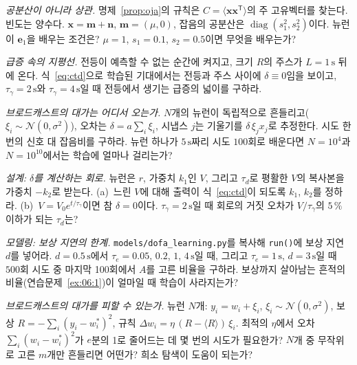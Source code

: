 \begin{exercise}[\lvlB]
\label{ex:06:3}
\emph{공분산이 아니라 상관.} 명제~\ref{prop:oja}의 규칙은 $C=\langle\mathbf x\mathbf x^{\mathsf T}\rangle$의 주 고유벡터를 찾는다. 빈도는 양수다. $\mathbf x=\mathbf m+\mathbf n$, $\mathbf m=(\mu,0)$, 잡음의 공분산은 $\operatorname{diag}(s_1^2,s_2^2)$이다. 뉴런이 $\mathbf e_1$을 배우는 조건은? $\mu=1$, $s_1=0.1$, $s_2=0.5$이면 무엇을 배우는가?
\end{exercise}

\begin{exercise}[\lvlA]
\label{ex:06:4}
\emph{급증 속의 지평선.} 전등이 예측할 수 없는 순간에 켜지고, 크기 $R$의 주스가 $L=1\,\text{s}$ 뒤에 온다. 식~\eqref{eq:ctd}으로 학습된 기대에서는 전등과 주스 사이에 $\delta\equiv0$임을 보이고, $\tau_\gamma=2\,\text{s}$와 $\tau_\gamma=4\,\text{s}$일 때 전등에서 생기는 급증의 넓이를 구하라.
\end{exercise}

\begin{exercise}[\lvlB]
\label{ex:06:5}
\emph{브로드캐스트의 대가는 어디서 오는가.} $N$개의 뉴런이 독립적으로 흔들리고($\xi_i\sim\mathcal N(0,\sigma^2)$), 오차는 $\delta=a\sum_i\xi_i$, 시냅스 $j$는 기울기를 $\delta\,\xi_jx_j$로 추정한다. 시도 한 번의 신호 대 잡음비를 구하라. 뉴런 하나가 $5\,\text{s}$짜리 시도 $100$회로 배운다면 $N=10^4$과 $N=10^{10}$에서는 학습에 얼마나 걸리는가?
\end{exercise}

\begin{exercise}[\lvlB]
\label{ex:06:6}
\emph{설계: $\delta$를 계산하는 회로.}  뉴런은 $r$, 가중치 $k_1$인 $V$, 그리고 $\tau_d$로 평활한 $V$의 복사본을 가중치 $-k_2$로 받는다. (a)~느린 $V$에 대해 출력이 식~\eqref{eq:ctd}이 되도록 $k_1$, $k_2$를 정하라. (b)~$V=V_0e^{t/\tau_\gamma}$이면 참 $\delta=0$이다. $\tau_\gamma=2\,\text{s}$일 때 회로의 거짓 오차가 $V/\tau_\gamma$의 $5\,\%$ 이하가 되는 $\tau_d$는?
\end{exercise}

\begin{exercise}[\lvlB]
\label{ex:06:7}
\emph{모델링: 보상 지연의 한계.} \texttt{models/\allowbreak dofa\_learning.py}를 복사해 \texttt{run()}에 보상 지연 $d$를 넣어라. $d=0.5\,\text{s}$에서 $\tau_e=0.05$, $0.2$, $1$, $4\,\text{s}$일 때, 그리고 $\tau_e=1\,\text{s}$, $d=3\,\text{s}$일 때 $500$회 시도 중 마지막 100회에서 $A$를 고른 비율을 구하라. 보상까지 살아남는 흔적의 비율(연습문제~\ref{ex:06:1})이 얼마일 때 학습이 사라지는가?
\end{exercise}

\begin{exercise}[\lvlC]
\label{ex:06:8}
\emph{브로드캐스트의 대가를 피할 수 있는가.} 뉴런 $N$개: $y_i=w_i+\xi_i$, $\xi_i\sim\mathcal N(0,\sigma^2)$, 보상 $R=-\sum_i(y_i-w_i^*)^2$, 규칙 $\Delta w_i=\eta\,(R-\langle R\rangle)\,\xi_i$. 최적의 $\eta$에서 오차 $\sum_i(w_i-w_i^*)^2$가 $e$분의 1로 줄어드는 데 몇 번의 시도가 필요한가? $N$개 중 무작위로 고른 $m$개만 흔들리면 어떤가? 희소 탐색이 도움이 되는가?
\end{exercise}
